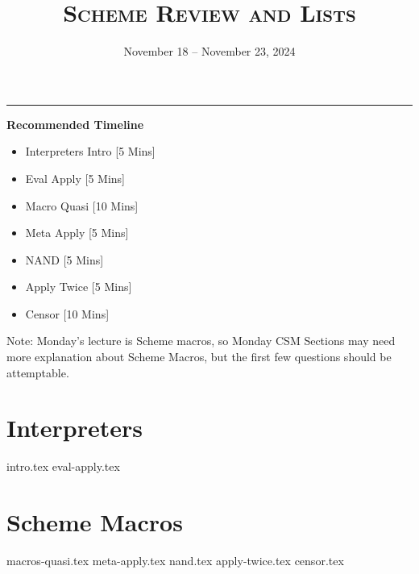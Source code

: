 \documentclass{exam}
\title{\textsc{Scheme Review and Lists}}
\date{November 18 -- November 23, 2024}
\begin{document}
\maketitle
\rule{\textwidth}{0.15em}

\begin{meta} %
    \begin{blocksection}
        \textbf{Recommended Timeline}
        \begin{itemize}
            \item Interpreters Intro [5 Mins]
            \item Eval Apply [5 Mins]
            \item Macro Quasi [10 Mins]
            \item Meta Apply [5 Mins]
            \item NAND [5 Mins]
            \item Apply Twice [5 Mins]
            \item Censor [10 Mins]
        \end{itemize}

        Note: Monday's lecture is Scheme macros, so Monday CSM Sections may need more explanation about Scheme Macros, but the first few questions should be attemptable. 
    \end{blocksection}
\end{meta}

\section{Interpreters}
\begin{questions}
{intro.tex}
{eval-apply.tex}
\end{questions}

\section{Scheme Macros}
\begin{questions}
    {macros-quasi.tex}
    {meta-apply.tex}
    {nand.tex}
    {apply-twice.tex}
    {censor.tex}
\end{questions}
\end{document}
